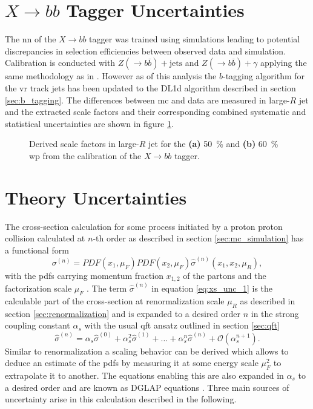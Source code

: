 \section{$X\rightarrow bb$ Tagger Uncertainties}
The \ac{nn} of the $X\rightarrow bb$ tagger was trained using simulations leading to potential discrepancies in selection efficiencies between observed data and simulation. Calibration is conducted with $Z(\rightarrow b\overline{b})+\text{jets}$ and $Z(\rightarrow b\overline{b})+\gamma$ applying the same methodology as in \citep{ATL-PHYS-PUB-2021-035}. However as of this analysis the $b$-tagging algorithm for the \ac{vr} track jets has been updated to the DL1d algorithm described in section \ref{sec:b_tagging}. The differences between \ac{mc} and data are measured in large-$R$ jet \pt and the extracted scale factors and their corresponding combined systematic and statistical uncertainties are shown in figure \ref{fig:xbb_sf}.
\begin{figure}
    \centering
    \caption[]{Derived scale factors in large-$R$ jet \pt for the \textbf{(a)} \qty[]{50}{\percent} and \textbf{(b)} \qty[]{60}{\percent} \ac{wp} from the calibration of the $X\rightarrow bb$ tagger.}
    \label{fig:xbb_sf}
\end{figure}

\section{Theory Uncertainties}
The cross-section calculation for some process initiated by a proton proton collision calculated at $n$-th order as described in section \ref{sec:mc_simulation} has a functional form
\begin{equation}
    \sigma^{(n)} = PDF(x_1, \mu_F)  PDF(x_2, \mu_F) \hat{\sigma}^{(n)}(x_1,x_2,\mu_R),
    \label{eq:xs_unc_1}
\end{equation}
with the \acfp{pdf} carrying momentum fraction $x_{1,2}$ of the partons and the factorization scale $\mu_F$ \citep{unc_recipe}. The term $\hat{\sigma}^{(n)}$ in equation \ref{eq:xs_unc_1} is the calculable part of the cross-section at renormalization scale $\mu_R$ as described in section \ref{sec:renormalization} and is expanded to a desired order $n$ in the strong coupling constant $\alpha_s$ with the usual \ac{qft} ansatz outlined in section \ref{sec:qft}
\begin{equation}
    \hat{\sigma}^{(n)} = \alpha_s \hat{\sigma}^{(0)} + \alpha_s^2 \hat{\sigma}^{(1)} + \ldots + \alpha_s^n \hat{\sigma}^{(n)} + \mathcal{O}(\alpha_s^{n+1}).
    \label{eq:xs_unc_2}
\end{equation}
Similar to renormalization a scaling behavior can be derived which allows to deduce an estimate of the \acp{pdf} by measuring it at some energy scale $\mu_F^2$ to extrapolate it to another. The equations enabling this are also expanded in $\alpha_s$ to a desired order and are known as DGLAP equations \citep{halzen1984introductory}. Three main sources of uncertainty arise in this calculation described in the following.

